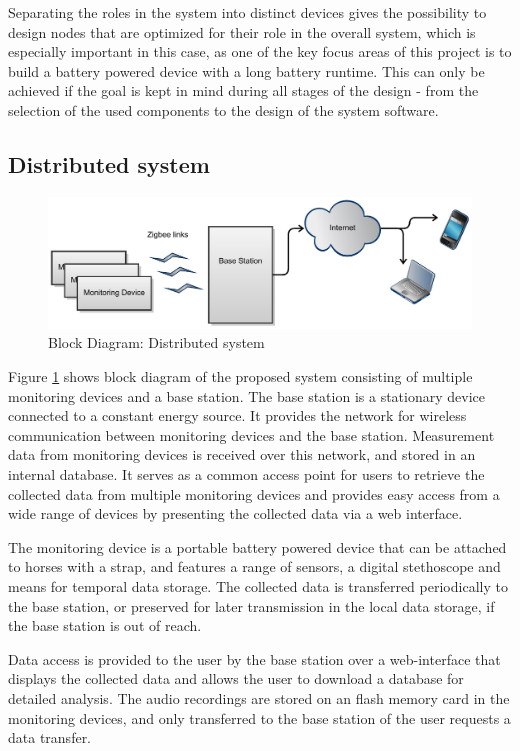 Separating the roles in the system into distinct devices gives the possibility to design nodes that are optimized for their role in the overall system, which is especially important in this case, as  one of the key focus areas of this project is to build a battery powered device with a long battery runtime. This can only be achieved if the goal is kept in mind during all stages of the design - from the selection of the used components to the design of the system software.

\subsection{Distributed system}
\begin{figure}[htb]
\centering
\includegraphics[width=\textwidth]{Images/gdp_system_block}
\caption{Block Diagram: Distributed system}
\label{fig:block_system}
\end{figure}

Figure \ref{fig:block_system} shows  block diagram of the proposed system consisting of multiple monitoring devices and a base station. 
The base station is a stationary device connected to a constant energy source. It provides the network for wireless communication between monitoring devices and the base station. Measurement data from monitoring devices is received over this network, and stored in an internal database. It serves as a common access point for users to retrieve the collected data from multiple monitoring devices and provides easy access from a wide range of devices by presenting the collected data via a web interface.

The monitoring device is a portable battery powered device that can be attached to horses with a strap, and features a range of sensors, a digital stethoscope and means for temporal data storage. The collected data is transferred periodically to the base station, or preserved for later transmission in the local data storage, if the base station is out of reach.

Data access is provided to the user by the base station over a web-interface that displays the collected data and allows the user to download a database for detailed analysis. The audio recordings are stored on an flash memory card in the monitoring devices, and only transferred to the base station of the user requests a data transfer.

